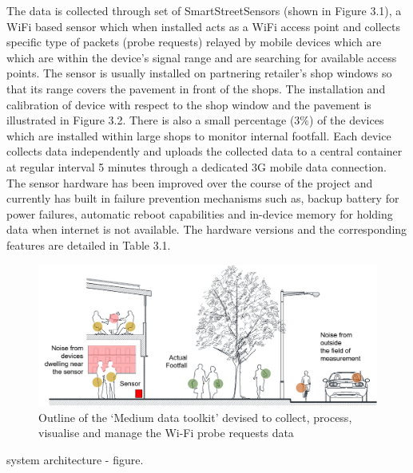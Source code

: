 The data is collected through set of SmartStreetSensors (shown in Figure 3.1), a WiFi based sensor which when installed acts as a WiFi access point and collects specific type of packets (probe requests) relayed by mobile devices which are which are within the device’s signal range and are searching for available access points.
The sensor is usually installed on partnering retailer's shop windows so that its range covers the pavement in front of the shops.
The installation and calibration of device with respect to the shop window and the pavement is illustrated in Figure 3.2.
There is also a small percentage (3\%) of the devices which are installed within large shops to monitor internal footfall.
Each device collects data independently and uploads the collected data to a central container at regular interval 5 minutes through a dedicated 3G mobile data connection.
The sensor hardware has been improved over the course of the project and currently has built in failure prevention mechanisms such as, backup battery for power failures, automatic reboot capabilities and in-device memory for holding data when internet is not available.
The hardware versions and the corresponding features are detailed in Table 3.1.

\begin{figure}
  \includegraphics{images/sss.png}
  \caption{Outline of the `Medium data toolkit' devised to collect, process, visualise and manage the Wi-Fi probe requests data}
  \label{figure:literature:tech:timeline}
\end{figure}

\lipsum[1-2]

system architecture - figure.

